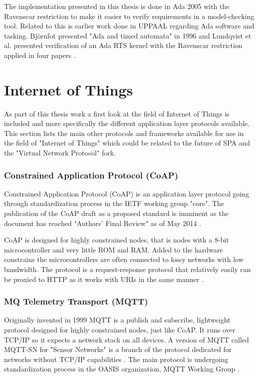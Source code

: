 The implementation presented in this thesis is done in Ada 2005 with the
Ravenscar restriction to make it easier to verify requirements in a
model-checking tool. Related to this is earlier work done in UPPAAL regarding
Ada software and tasking. Bj\"{o}rnfot presented "Ada and timed automata" in
1996 \cite{bjornfot1996} and Lundqvist et al. presented verification of an Ada
RTS kernel with the Ravenscar restriction applied in four papers
\cite{lundqvist1999f,lundqvist1999g,lundqvist1999h,lundqvist2003}.

\section{Internet of Things} \label{sec:sota:internet_of_things}
As part of this thesis work a first look at the field of Internet of Things is
included and more specifically the different application layer protocols
available. This section lists the main other protocols and frameworks available
for use in the field of "Internet of Things" which could be related to the
future of SPA and the "Virtual Network Protocol" fork.

\subsubsection{Constrained Application Protocol (CoAP)}
Constrained Application Protocol (CoAP) is an application layer protocol
going through standardization process in the IETF working group "core". The
publication of the CoAP draft as a proposed standard is imminent as the
document has reached "Authors' Final Review" as of May 2014 \cite{web:wgcore}.

CoAP is designed for highly constrained nodes, that is nodes with a 8-bit
microcontroller and very little ROM and RAM. Added to the hardware constrains
the microcontrollers are often connected to lossy networks with low bandwidth.
The protocol is a request-response protocol that relatively easily can be
proxied to HTTP as it works with URIs in the same manner \cite{web:draftcoap}.

\subsubsection{MQ Telemetry Transport (MQTT)}
Originally invented in 1999 MQTT is a publish and subscribe, lightweight
protocol designed for highly constrained nodes, just like CoAP. It runs
over TCP/IP so it expects a network stack on all devices. A version of MQTT
called MQTT-SN for "Sensor Networks" is a branch of the protocol dedicated for
networks without TCP/IP capabilities \cite{web:mqtt,web:mqtt-sn}. The main
protocol is undergoing standardization process in the OASIS organization, MQTT
Working Group \cite{web:oasis-mqtt}.

